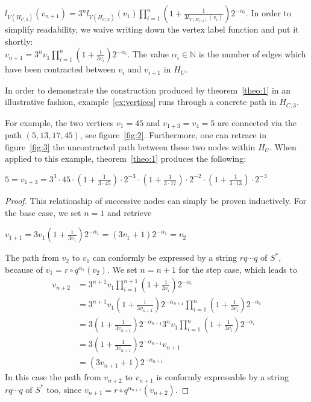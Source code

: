 \begin{theorem}
	\label{theo:1}
	$l_{V(H_{C,3})}(v_{n+1})=3^nl_{V(H_{C,3})}(v_1)\prod_{i=1}^{n}\left(1+\frac{1}{3l_{V(H_{C,3})}(v_{i})}\right)2^{-\alpha_i}$.
	In order to simplify readability, we waive writing down the vertex label function and put it shortly:\\
	$v_{n+1}=3^nv_1\prod_{i=1}^{n}\left(1+\frac{1}{3v_{i}}\right)2^{-\alpha_i}$.
	The value $\alpha_i\in\mathbb{N}$ is the number of edges which have been contracted between $v_i$ and $v_{i+1}$ in $H_U$.
\end{theorem}

In order to demonstrate the construction produced by theorem~\ref{theo:1} in an illustrative fashion, example~\ref{ex:vertices} runs through a concrete path in $H_{C,3}$.

\begin{example}
	\label{ex:vertices}
	For example, the two vertices $v_1=45$ and $v_{1+3}=v_4=5$ are 
	connected
	via the path $(5,13,17,45)$, see figure~\ref{fig:2}. Furthermore, one
	can retrace in figure~\ref{fig:3} the uncontracted path between these
	two nodes within $H_U$. When applied to this example,
	theorem~\ref{theo:1} produces the following:	
	\begin{center}
		$5=v_{1+3}=3^3\cdot45\cdot\left(1+\frac{1}{3\cdot45}\right)\cdot2^{-3}
		\cdot\left(1+\frac{1}{3\cdot17}\right)\cdot2^{-2}
		\cdot\left(1+\frac{1}{3\cdot13}\right)\cdot2^{-3}$
	\end{center} 
\end{example}

\begin{proof}
	\label{proof:1}
	This relationship of successive nodes can simply be proven inductively. For the base case, we set $n=1$ and retrieve
	\begin{center}
		$v_{1+1}=3v_1\left(1+\frac{1}{3v_1}\right)2^{-\alpha_1}
		=\left(3v_1+1\right)2^{-\alpha_1}=v_2$
	\end{center}
	The path from $v_2$ to $v_1$ can conformly be expressed by a string $rq\cdots q$ of $S^\ast$, because of $v_1=r\circ q^{\alpha_1}\left(v_2\right)$. We set $n=n+1$ for the step case, which leads to
	\begin{equation*}
	\begin{array}{cl}
	v_{n+2} &
	=3^{n+1}v_1\prod_{i=1}^{n+1}\left(1+\frac{1}{3v_i}\right)2^{-\alpha_i}\\
	&
	=3^{n+1}v_1\left(1+\frac{1}{3v_{n+1}}\right)2^{-\alpha_{n+1}}\prod_{i=1}^{n}\left(1+\frac{1}{3v_i}\right)2^{-\alpha_i}\\
	&
	=3\left(1+\frac{1}{3v_{n+1}}\right)2^{-\alpha_{n+1}}3^nv_1\prod_{i=1}^{n}\left(1+\frac{1}{3v_i}\right)2^{-\alpha_i}\\
	&
	=3\left(1+\frac{1}{3v_{n+1}}\right)2^{-\alpha_{n+1}}v_{n+1}\\
	&
	=\left(3v_{n+1}+1\right)2^{-\alpha_{n+1}}
	\end{array}
	\end{equation*}
	In this case the path from $v_{n+2}$ to $v_{n+1}$ is conformly 
	expressable by a string $rq\cdots q$ of $S^\ast$ too, since
	$v_{n+1}=r\circ q^{\alpha_{n+1}}\left(v_{n+2}\right)$.
\end{proof}

